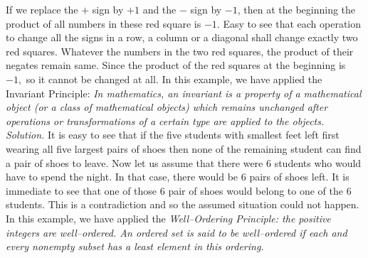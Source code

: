 \begin{multicols}{2}
\begin{center}
	\end{center}	
	If we replace the $+$ sign by $+1$ and the $-$ sign by $-1$, then at the beginning the product of all numbers in these red square is $-1.$ 
	Easy to see that each operation to change all the signs in a row, a column or a diagonal shall change exactly two red squares.
	Whatever the numbers in the two red squares, the product of their negates remain same.
	Since the product of the red squares at the beginning is $-1,$ so it cannot be changed at all.
	\vskip 0.1cm
	In this example, we have applied the Invariant Principle: \textit{In mathematics, an invariant is a property of a mathematical object
		(or a class of mathematical objects) which remains unchanged after operations or transformations of a certain type are applied to the objects.} 
	\vskip 0.2cm
	\vskip 0.2cm
	\textit{Solution.}
	It is easy to see that if the five students with smallest feet left first wearing all five largest pairs of shoes
	then none of the remaining student can find a pair of shoes to leave.
	Now let us assume that there were $6$ students who would have to spend the night. In that case, there would be $6$ pairs of shoes left. It is immediate to see that one of those $6$ pair of shoes would belong to one of the $6$ students. This is a contradiction and so the assumed situation could not happen.
	\vskip 0.1cm
	In this example, we have applied the \textit{Well--Ordering Principle: the positive integers are well--ordered.
		An ordered set is said to be well--ordered if each and every nonempty subset has a least element in this ordering.} 
	\vskip 0.2cm
\end{multicols}
